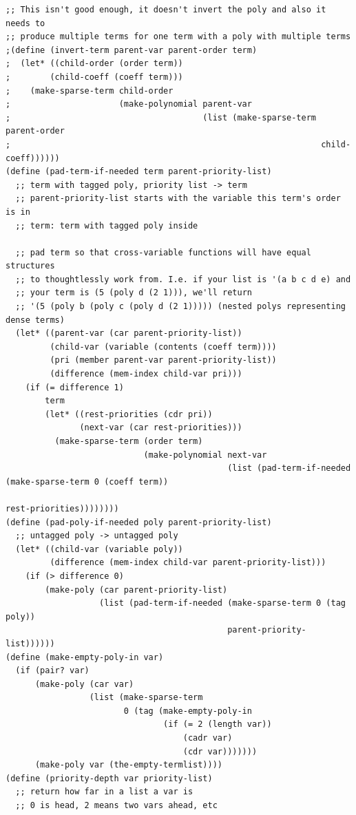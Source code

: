 \documentclass[final,fleqn,titlepage,twoside]{article}
\begin{document}
\begin{verbatim}
;; This isn't good enough, it doesn't invert the poly and also it needs to
;; produce multiple terms for one term with a poly with multiple terms
;(define (invert-term parent-var parent-order term)
;  (let* ((child-order (order term))
;        (child-coeff (coeff term)))
;    (make-sparse-term child-order
;                      (make-polynomial parent-var
;                                       (list (make-sparse-term parent-order
;                                                               child-coeff))))))
(define (pad-term-if-needed term parent-priority-list)
  ;; term with tagged poly, priority list -> term
  ;; parent-priority-list starts with the variable this term's order is in
  ;; term: term with tagged poly inside

  ;; pad term so that cross-variable functions will have equal structures
  ;; to thoughtlessly work from. I.e. if your list is '(a b c d e) and
  ;; your term is (5 (poly d (2 1))), we'll return
  ;; '(5 (poly b (poly c (poly d (2 1))))) (nested polys representing dense terms)
  (let* ((parent-var (car parent-priority-list))
         (child-var (variable (contents (coeff term))))
         (pri (member parent-var parent-priority-list))
         (difference (mem-index child-var pri)))
    (if (= difference 1)
        term
        (let* ((rest-priorities (cdr pri))
               (next-var (car rest-priorities)))
          (make-sparse-term (order term)
                            (make-polynomial next-var
                                             (list (pad-term-if-needed (make-sparse-term 0 (coeff term))
                                                                       rest-priorities))))))))
(define (pad-poly-if-needed poly parent-priority-list)
  ;; untagged poly -> untagged poly
  (let* ((child-var (variable poly))
         (difference (mem-index child-var parent-priority-list)))
    (if (> difference 0)
        (make-poly (car parent-priority-list)
                   (list (pad-term-if-needed (make-sparse-term 0 (tag poly))
                                             parent-priority-list))))))
(define (make-empty-poly-in var)
  (if (pair? var)
      (make-poly (car var)
                 (list (make-sparse-term
                        0 (tag (make-empty-poly-in
                                (if (= 2 (length var))
                                    (cadr var)
                                    (cdr var)))))))
      (make-poly var (the-empty-termlist))))
(define (priority-depth var priority-list)
  ;; return how far in a list a var is
  ;; 0 is head, 2 means two vars ahead, etc

\end{verbatim}
\end{document}
